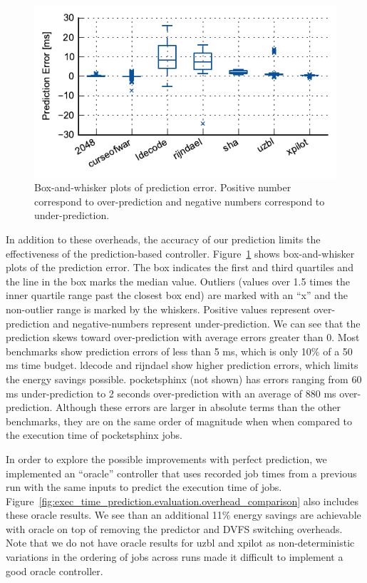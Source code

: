 \begin{figure}
  \begin{center}
    \includegraphics{exec_time_prediction/data/prediction_error.pdf}
    \caption{Box-and-whisker plots of prediction error. Positive number
    correspond to over-prediction and negative numbers correspond to
    under-prediction.}
    \label{fig:exec_time_prediction.evaluation.prediction_error}
  \end{center}
\end{figure}

In addition to these overheads, the accuracy of our prediction limits the
effectiveness of the prediction-based controller.
Figure~\ref{fig:exec_time_prediction.evaluation.prediction_error} shows
box-and-whisker plots of the prediction error.  The box indicates the first and
third quartiles and the line in the box marks the median value. Outliers
(values over 1.5 times the inner quartile range past the closest box end) are
marked with an ``x'' and the non-outlier range is marked by the whiskers.
Positive values represent over-prediction and negative-numbers represent
under-prediction. We can see that the prediction skews toward over-prediction
with average errors greater than 0.  Most benchmarks show prediction errors of
less than 5 ms, which is only 10\% of a 50 ms time budget. ldecode and rijndael
show higher prediction errors, which limits the energy savings possible.
pocketsphinx (not shown) has errors ranging from 60 ms under-prediction to 2
seconds over-prediction with an average of 880 ms over-prediction. Although
these errors are larger in absolute terms than the other benchmarks, they are
on the same order of magnitude when when compared to the execution time of
pocketsphinx jobs.

In order to explore the possible improvements with perfect prediction, we
implemented an ``oracle'' controller that uses recorded job times from a
previous run with the same inputs to predict the execution time of jobs.
Figure~\ref{fig:exec_time_prediction.evaluation.overhead_comparison} also
includes these oracle results. We see than an additional 11\% energy savings
are achievable with oracle on top of removing the predictor and DVFS switching
overheads. Note that we do not have oracle results for uzbl and xpilot as
non-deterministic variations in the ordering of jobs across runs made it
difficult to implement a good oracle controller.

